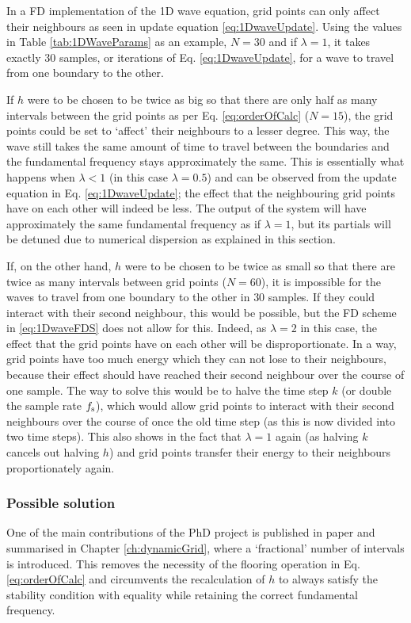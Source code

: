 In a FD implementation of the 1D wave equation, grid points can only affect their neighbours as seen in update equation \eqref{eq:1DwaveUpdate}. Using the values in Table \ref{tab:1DWaveParams} as an example, $N=30$ and if $\lambda = 1$, it takes exactly $30$ samples, or iterations of Eq. \eqref{eq:1DwaveUpdate}, for a wave to travel from one boundary to the other. 

If $h$ were to be chosen to be twice as big so that there are only half as many intervals between the grid points as per Eq. \eqref{eq:orderOfCalc} ($N=15$), the grid points could be set to `affect' their neighbours to a lesser degree. This way, the wave still takes the same amount of time to travel between the boundaries and the fundamental frequency stays approximately the same. This is essentially what happens when $\lambda < 1$ (in this case $\lambda = 0.5$) and can be observed from the update equation in Eq. \eqref{eq:1DwaveUpdate}; the effect that the neighbouring grid points have on each other will indeed be less. The output of the system will have approximately the same fundamental frequency as if $\lambda = 1$, but its partials will be detuned due to numerical dispersion as explained in this section.

If, on the other hand, $h$ were to be chosen to be twice as small so that there are twice as many intervals between grid points ($N = 60$), it is impossible for the waves to travel from one boundary to the other in $30$ samples. If they could interact with their second neighbour, this would be possible, but the FD scheme in \eqref{eq:1DwaveFDS} does not allow for this. Indeed, as $\lambda = 2$ in this case, the effect that the grid points have on each other will be disproportionate. In a way, grid points have too much energy which they can not lose to their neighbours, because their effect should have reached their second neighbour over the course of one sample. The way to solve this would be to halve the time step $k$ (or double the sample rate $f_\text{s}$), which would allow grid points to interact with their second neighbours over the course of once the old time step (as this is now divided into two time steps). This also shows in the fact that $\lambda = 1$ again (as halving $k$ cancels out halving $h$) and grid points transfer their energy to their neighbours proportionately again.

\subsubsection{Possible solution}
One of the main contributions of the PhD project is published in paper \citeP[G] and summarised in Chapter \ref{ch:dynamicGrid}, where a `fractional' number of intervals is introduced. This removes the necessity of the flooring operation in Eq. \eqref{eq:orderOfCalc} and circumvents the recalculation of $h$ to always satisfy the stability condition with equality while retaining the correct fundamental frequency.